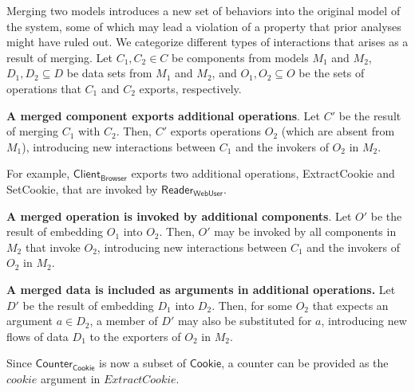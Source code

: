 Merging two models introduces a new set of behaviors into
the original model of the system, some of which may lead a violation
of a property that prior analyses might have ruled out. We categorize
different types of interactions that arises as a result of
merging. Let $C_1, C_2 \in C$ be components from models $M_1$ and
$M_2$, $D_1, D_2 \subseteq D$ be data sets from $M_1$ and $M_2$, and
$O_1, O_2 \subseteq O$ be the sets of operations that $C_1$ and $C_2$
exports, respectively. 

\textbf{A merged component exports additional operations}. Let $C'$ be
the result of merging $C_1$ with $C_2$. Then, $C'$ exports operations
$O_2$ (which are absent from $M_1$), introducing new interactions
between $C_1$ and the invokers of $O_2$ in $M_2$. 

For example, $\textsf{Client}_\textsf{Browser}$ exports two additional
operations, \textsf{ExtractCookie} and \textsf{SetCookie}, that are
invoked by $\textsf{Reader}_\textsf{WebUser}$.

\textbf{A merged operation is invoked by additional components}. Let $O'$
be the result of embedding $O_1$ into $O_2$. Then, $O'$ may be invoked
by all components in $M_2$ that invoke $O_2$, introducing new interactions
between $C_1$ and the invokers of $O_2$ in $M_2$.

\textbf{A merged data is included as arguments in additional
  operations.}  Let $D'$ be the result of embedding $D_1$ into
$D_2$. Then, for some $O_2$ that expects an argument $a \in D_2$,
a member of $D'$ may also be substituted for $a$, introducing new
flows of data $D_1$ to the exporters of $O_2$ in $M_2$.

Since $\textsf{Counter}_\textsf{Cookie}$ is now a
subset of $\textsf{Cookie}$, a counter can be provided as the $cookie$
argument in $ExtractCookie$.



